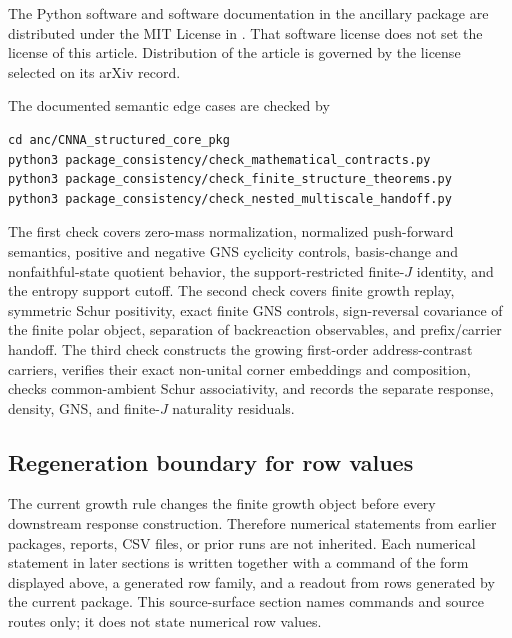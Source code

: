 \documentclass[11pt]{article}
\theoremstyle{remark}
\newcommand{\src}[1]{{\scriptsize\path{#1}}}
\numberwithin{equation}{section}
\begin{document}
The Python software and software documentation in the ancillary package are distributed under the MIT License in \src{LICENSE}. That software license does not set the license of this article. Distribution of the article is governed by the license selected on its arXiv record.

The documented semantic edge cases are checked by
\begin{verbatim}
cd anc/CNNA_structured_core_pkg
python3 package_consistency/check_mathematical_contracts.py
python3 package_consistency/check_finite_structure_theorems.py
python3 package_consistency/check_nested_multiscale_handoff.py
\end{verbatim}
The first check covers zero-mass normalization, normalized push-forward semantics, positive and negative GNS cyclicity controls, basis-change and nonfaithful-state quotient behavior, the support-restricted finite-\(J\) identity, and the entropy support cutoff. The second check covers finite growth replay, symmetric Schur positivity, exact finite GNS controls, sign-reversal covariance of the finite polar object, separation of backreaction observables, and prefix/carrier handoff. The third check constructs the growing first-order address-contrast carriers, verifies their exact non-unital corner embeddings and composition, checks common-ambient Schur associativity, and records the separate response, density, GNS, and finite-\(J\) naturality residuals.

\subsection{Regeneration boundary for row values}
The current growth rule changes the finite growth object before every downstream response construction. Therefore numerical statements from earlier packages, reports, CSV files, or prior runs are not inherited. Each numerical statement in later sections is written together with a command of the form displayed above, a generated row family, and a readout from rows generated by the current package. This source-surface section names commands and source routes only; it does not state numerical row values.
\end{document}
